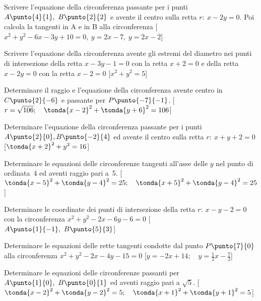 \begin{esercizio}\label{ese:} 
Scrivere l'equazione della circonferenza passante per i punti 
\(A\punto{4}{1},~B\punto{2}{2}\) e avente il centro sulla retta \(r:~x-2y=0\).
Poi calcola la tangenti in A e in B alla circonferenza 
\hfill [\(x^2+y^2-6x-3y+10=0,~y=2x-7,~y=2x-2\)]
\end{esercizio}

\begin{esercizio}\label{ese:}
Scrivere l'equazione della circonferenza avente gli estremi del diametro 
nei punti di intersezione della retta \(x-3y-1=0\) con la retta \(x+2=0\)
e della retta \(x-2y=0\) con la retta \(x-2=0\)
\hfill[\(x^2+y^2 = 5\)]
\end{esercizio}

\begin{esercizio}\label{ese:}
Determinare il raggio e l'equazione della circonferenza avente centro in 
\(C\punto{2}{-6}\) e passante per \(P\punto{-7}{-1}\).
\hfill [\(r=\sqrt{106}; \quad \tonda{x-2}^2+\tonda{y+6}^2=106\)]
\end{esercizio}

\begin{esercizio}\label{ese:}
Determinare l'equazione della circonferenza passante per i punti 
\(A\punto{2}{0}, B\punto{-2}{4}\) 
ed avente il centro sulla retta  \(r:~x+y+2=0\) 
\hfill [\(\tonda{x+2}^2+y^2=16\)]
\end{esercizio}

\begin{esercizio}\label{ese:}
Determinare le equazioni delle circonferenze tangenti all'asse delle \(y\) nel 
punto di ordinata~4 ed aventi raggio pari a~5.
\hfill [\(\tonda{x-5}^2+\tonda{y-4}^2=25; \quad 
\tonda{x+5}^2+\tonda{y-4}^2=25\)]
\end{esercizio}

\begin{esercizio}\label{ese:}
Determinare le coordinate dei punti di intersezione della retta 
\(r:~x-y-2=0\) con la circonferenza \(x^2 +y^2 -2x-6y-6=0\)
\hfill [\(A\punto{1}{-1},~B\punto{5}{3}\)]  
\end{esercizio}

\begin{esercizio}\label{ese:} 
Determinare le equazioni delle rette tangenti condotte dal punto 
\(P\punto{7}{0}\) alla circonferenza \(x^2 +y^2 -2x-4y-15=0\)
\hfill [\(y=-2x+14; \quad y=\frac{1}{2}x-\frac{7}{2}\)]
\end{esercizio}

\begin{esercizio}\label{ese:}
Determinare le equazioni delle circonferenze passanti per 
\(A\punto{1}{0},~B\punto{0}{1}\) ed aventi raggio pari a \(\sqrt{5}\).          
\hfill [\(\tonda{x-2}^2+\tonda{y-2}^2=5; \quad \tonda{x+1}^2+\tonda{y+1}^2=5\)]
\end{esercizio}

